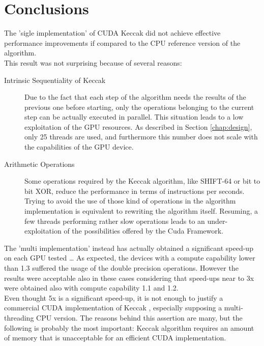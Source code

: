 \chapter{Conclusions} \label{chap:conclusions}
The 'sigle implementation' of CUDA Keccak did not achieve effective performance improvements if compared to the CPU reference version of the algorithm.\\
This result was not surprising because of several reasons:
\begin{description}
\item [Intrinsic Sequentiality of Keccak] Due to the fact that each step of the algorithm needs the results of the previous one before starting, only the operations belonging to the current step can be actually executed in parallel. This situation leads to a low exploitation of the GPU resources. As described in Section \ref{chap:design}, only 25 threads are used, and furthermore this number does not scale with the capabilities of the GPU device.
\item [Arithmetic Operations] Some operations required by the Keccak algorithm, like SHIFT-64 or bit to bit XOR, reduce the performance in terms of instructions per seconds. Trying to avoid the use of those kind of operations in the algorithm implementation is equivalent to rewriting the algorithm itself. Resuming, a few threads performing rather slow operations leads to an under-exploitation of the possibilities offered by the Cuda Framework.
\end{description}
The 'multi implementation' instead has actually obtained a significant speed-up on each GPU tested \dots
As expected, the devices with a compute capability lower than 1.3 suffered the usage of the double precision operations. However the results were acceptable also in these cases considering that speed-ups near to 3x were obtained also with compute capability 1.1 and 1.2.\\
Even thought 5x is a significant speed-up, it is not enough to justify a commercial CUDA implementation of Keccak , especially supposing a multi-threading CPU version. The reasons behind this assertion are many, but the following is probably the most important: Keccak algorithm requires an amount of memory that is unacceptable for an efficient CUDA implementation.\\
